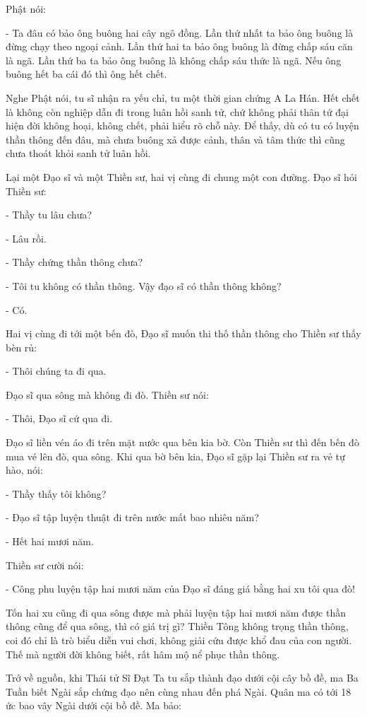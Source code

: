 \documentclass[
  12pt,
  oneside]{book}
\begin{document}
Phật nói:

- Ta đâu có bảo ông buông hai cây ngô đồng. Lần thứ nhất ta bảo ông buông là đừng chạy theo ngoại cảnh. Lần thứ hai ta bảo ông buông là đừng chấp sáu căn là ngã. Lần thứ ba ta bảo ông buông là không chấp sáu thức là ngã. Nếu ông buông hết ba cái đó thì ông hết chết.

Nghe Phật nói, tu sĩ nhận ra yếu chỉ, tu một thời gian chứng A La Hán. Hết chết là không còn nghiệp dẫn đi trong luân hồi sanh tử, chứ không phải thân tứ đại hiện đời không hoại, không chết, phải hiểu rõ chỗ này. Để thấy, dù có tu có luyện thần thông đến đâu, mà chưa buông xả được cảnh, thân và tâm thức thì cũng chưa thoát khỏi sanh tử luân hồi.

Lại một Đạo sĩ và một Thiền sư, hai vị cùng đi chung một con đường. Đạo sĩ hỏi Thiền sư:

- Thầy tu lâu chưa?

- Lâu rồi.

- Thầy chứng thần thông chưa?

- Tôi tu không có thần thông. Vậy đạo sĩ có thần thông không?

- Có.

Hai vị cùng đi tới một bến đò, Đạo sĩ muốn thi thố thần thông cho Thiền sư thấy bèn rủ:

- Thôi chúng ta đi qua.

Đạo sĩ qua sông mà không đi đò. Thiền sư nói:

- Thôi, Đạo sĩ cứ qua đi.

Đạo sĩ liền vén áo đi trên mặt nước qua bên kia bờ. Còn Thiền sư thì đến bến đò mua vé lên đò, qua sông. Khi qua bờ bên kia, Đạo sĩ gặp lại Thiền sư ra vẻ tự hào, nói:

- Thầy thấy tôi không?

- Đạo sĩ tập luyện thuật đi trên nước mất bao nhiêu năm?

- Hết hai mươi năm.

Thiền sư cười nói:

- Công phu luyện tập hai mươi năm của Đạo sĩ đáng giá bằng hai xu tôi qua đò!

Tốn hai xu cũng đi qua sông được mà phải luyện tập hai mươi năm được thần thông cũng để qua sông, thì có giá trị gì? Thiền Tông không trọng thần thông, coi đó chỉ là trò biểu diễn vui chơi, không giải cứu được khổ đau của con người. Thế mà người đời không biết, rất hâm mộ nể phục thần thông.

Trở về nguồn, khi Thái tử Sĩ Đạt Ta tu sắp thành đạo dưới cội cây bồ đề, ma Ba Tuần biết Ngài sắp chứng đạo nên cùng nhau đến phá Ngài. Quân ma có tới 18 ức bao vây Ngài dưới cội bồ đề. Ma bảo:
\end{document}
